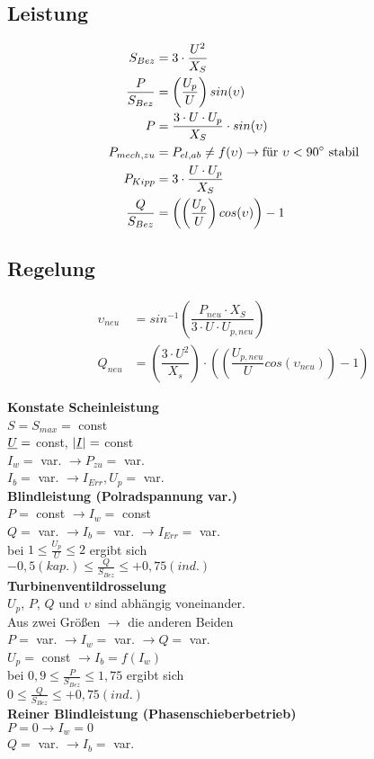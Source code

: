 \subsection{Leistung}
\begin{align*}
    S_{Bez} &= 3 \cdot \dfrac{U^2}{X_S}\\
    \dfrac{P}{S_{Bez}} &= \left(\dfrac{U_p}{U}\right) sin(\upsilon)\\
    P &= \dfrac{3 \cdot U \cdot U_p}{X_S} \cdot sin (\upsilon)\\
    P_{mech,zu} &= P_{el,ab} \neq f(\upsilon) \rightarrow \textnormal{für $\upsilon < 90\degree$ stabil}\\
    P_{Kipp} &= 3 \cdot \dfrac{U \cdot U_p}{X_S}\\
    \dfrac{Q}{S_{Bez}} &= \left(\left(\dfrac{U_p}{U}\right) cos(\upsilon)\right) -1    
\end{align*}

\subsection{Regelung}

\begin{align*}
    \upsilon_{neu} &= sin^{-1}\left( \dfrac{P_{neu} \cdot X_S}{3 \cdot U \cdot U_{p,neu}}\right)\\
    Q_{neu} &= \left( \dfrac{3 \cdot U^2}{X_s}\right) \cdot \left( \left( \dfrac{U_{p,neu}}{U} cos( \upsilon_{neu})\right)-1\right)
\end{align*}

\textbf{Konstate Scheinleistung}\\
\indent $S = S_{max} =$ const\\
\indent $\underline{U}=$ const, $|\underline{I}| =$ const\\
\indent $I_w =$ var. $\rightarrow P_{zu}=$ var.\\
\indent $I_b =$ var. $\rightarrow I_{Err}, U_p =$ var.\\

\textbf{Blindleistung (Polradspannung var.)}\\
\indent $P =$ const $\rightarrow I_w= $ const\\
\indent $Q =$ var. $\rightarrow I_b = $ var. $\rightarrow I_{Err}=$ var.\\
\indent bei $1 \leq \frac{U_p}{U} \leq 2$ ergibt sich \\
\indent $-0,5 (kap.) \leq \frac{Q}{S_{Bez}} \leq +0,75(ind.)$\\

\textbf{Turbinenventildrosselung}\\
$U_p$, $ P$, $Q$ und $\upsilon$ sind abhängig voneinander. \\
Aus zwei Größen $\rightarrow$ die anderen Beiden\\
\indent $P =$ var. $\rightarrow I_w= $ var. $\rightarrow Q =$ var.\\
\indent $U_p =$ const $\rightarrow I_b = f(I_w)$\\
\indent bei $0,9 \leq \frac{P}{S_{Bez}} \leq 1,75$ ergibt sich\\
\indent $0 \leq \frac{Q}{S_{Bez}} \leq +0,75(ind.)$\\


\textbf{Reiner Blindleistung (Phasenschieberbetrieb)}\\
\indent $P = 0 \rightarrow I_w= 0$ \\
\indent $Q =$ var. $\rightarrow I_b = $ var.
